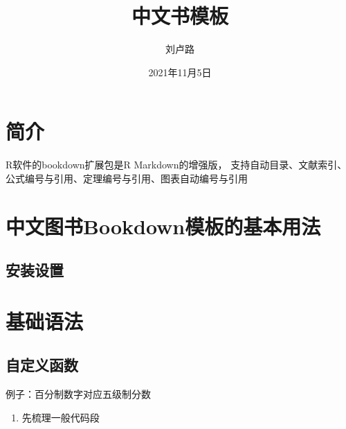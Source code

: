 \documentclass[
]{book}
\title{中文书模板}
\author{刘卢路}
\date{2021年11月5日}
\providecommand{\tightlist}{%
  \setlength{\itemsep}{0pt}\setlength{\parskip}{0pt}}
\begin{document}
\maketitle

{
\setcounter{tocdepth}{1}
\tableofcontents
}
\hypertarget{ux7b80ux4ecb}{%
\chapter*{简介}\label{ux7b80ux4ecb}}

R软件的bookdown扩展包是R Markdown的增强版，
支持自动目录、文献索引、公式编号与引用、定理编号与引用、图表自动编号与引用

\hypertarget{usage}{%
\chapter{中文图书Bookdown模板的基本用法}\label{usage}}

\hypertarget{usage-ins}{%
\section{安装设置}\label{usage-ins}}

\hypertarget{ux57faux7840ux8bedux6cd5}{%
\chapter{基础语法}\label{ux57faux7840ux8bedux6cd5}}

\hypertarget{ux81eaux5b9aux4e49ux51fdux6570}{%
\section{自定义函数}\label{ux81eaux5b9aux4e49ux51fdux6570}}

例子：百分制数字对应五级制分数

\begin{enumerate}
\def\labelenumi{\arabic{enumi}.}
\tightlist
\item
  先梳理一般代码段
\end{enumerate}
\end{document}
